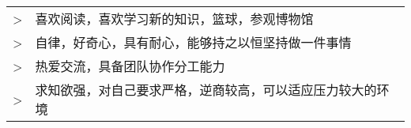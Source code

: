 \renewcommand{\arraystretch}{1.1}

	\begin{tabular}{>{}r>{}p{13cm}} 
		\textsc{>}  		&   喜欢阅读，喜欢学习新的知识，篮球，参观博物馆\\ 
		\textsc{>}          &   自律，好奇心，具有耐心，能够持之以恒坚持做一件事情\\ 
		\textsc{>}          &   热爱交流，具备团队协作分工能力\\
		\textsc{>}		    &   求知欲强，对自己要求严格，逆商较高，可以适应压力较大的环境\\
	\end{tabular}
